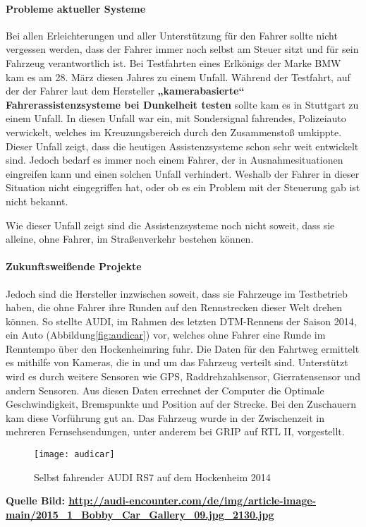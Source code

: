 \paragraph{Probleme aktueller Systeme} Bei allen Erleichterungen und aller Unterstützung für den Fahrer sollte nicht vergessen werden, dass der Fahrer immer noch selbst am Steuer sitzt und für sein Fahrzeug verantwortlich ist. Bei Testfahrten eines Erlkönigs der Marke BMW kam es am 28. März diesen Jahres zu einem Unfall. Während der Testfahrt, auf der der Fahrer laut dem Hersteller \textbf{„kamerabasierte“ Fahrerassistenzsysteme bei Dunkelheit testen} sollte kam es in Stuttgart zu einem Unfall. In diesen Unfall war ein, mit Sondersignal fahrendes, Polizeiauto verwickelt, welches im Kreuzungsbereich durch den Zusammenstoß umkippte.
Dieser Unfall zeigt, dass die heutigen Assistenzsysteme schon sehr weit entwickelt sind. Jedoch bedarf es immer noch einem Fahrer, der in Ausnahmesituationen eingreifen kann und einen solchen Unfall verhindert. Weshalb der Fahrer in dieser Situation nicht eingegriffen hat, oder ob es ein Problem mit der Steuerung gab ist nicht bekannt.

Wie dieser Unfall zeigt sind die Assistenzsysteme noch nicht soweit, dass sie alleine, ohne Fahrer, im Straßenverkehr bestehen können. 

\paragraph{Zukunftsweißende Projekte} Jedoch sind die Hersteller inzwischen soweit, dass sie Fahrzeuge im Testbetrieb haben, die ohne Fahrer ihre Runden auf den Rennstrecken dieser Welt drehen können. So stellte AUDI, im Rahmen des letzten DTM-Rennens der Saison 2014, ein Auto (Abbildung\vref{fig:audicar}) vor, welches ohne Fahrer eine Runde im Renntempo über den Hockenheimring fuhr. Die Daten für den Fahrtweg ermittelt es mithilfe von Kameras, die in und um das Fahrzeug verteilt sind. Unterstützt wird es durch weitere Sensoren wie GPS, Raddrehzahlsensor, Gierratensensor und andern Sensoren. Aus diesen Daten errechnet der Computer die Optimale Geschwindigkeit, Bremspunkte und Position auf der Strecke. Bei den Zuschauern kam diese Vorführung gut an. Das Fahrzeug wurde in der Zwischenzeit in mehreren Fernsehsendungen, unter anderem bei GRIP auf RTL II, vorgestellt. 
\begin{figure}[htb]
\centering
\texttt{[image: audicar]}
\caption{Selbst fahrender AUDI RS7 auf dem Hockenheim 2014 }
\label{fig:audicar}
\end{figure}
\textbf{Quelle Bild: \url{ http://audi-encounter.com/de/img/article-image-main/2015_1_Bobby_Car_Gallery_09.jpg_2130.jpg}}


